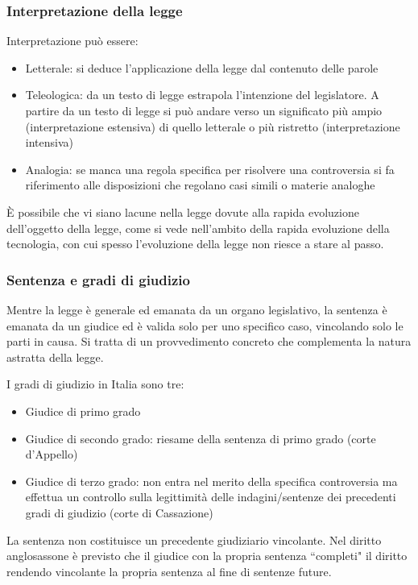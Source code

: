 \subsubsection{Interpretazione della legge}
Interpretazione può essere:
\begin{itemize}
    \item Letterale: si deduce l'applicazione della legge dal contenuto delle parole
    \item Teleologica: da un testo di legge estrapola l'intenzione del legislatore. A partire da un testo di legge si può andare verso un significato più ampio (interpretazione estensiva) di quello letterale o più ristretto (interpretazione intensiva)
    \item Analogia: se manca una regola specifica per risolvere una controversia si fa riferimento alle disposizioni che regolano casi simili o materie analoghe
\end{itemize}

È possibile che vi siano lacune nella legge dovute alla rapida evoluzione dell'oggetto della legge, come si vede nell'ambito della rapida evoluzione della tecnologia, con cui spesso l'evoluzione della legge non riesce a stare al passo.


\subsubsection{Sentenza e gradi di giudizio}
Mentre la legge è generale ed emanata da un organo legislativo, la sentenza è emanata da un giudice ed è valida solo per uno specifico caso, vincolando solo le parti in causa. Si tratta di un provvedimento concreto che complementa la natura astratta della legge.

I gradi di giudizio in Italia sono tre:
\begin{itemize}
    \item Giudice di primo grado
    \item Giudice di secondo grado: riesame della sentenza di primo grado (corte d'Appello)
    \item Giudice di terzo grado: non entra nel merito della specifica controversia ma effettua un controllo sulla legittimità delle indagini/sentenze dei precedenti gradi di giudizio (corte di Cassazione)
\end{itemize}

La sentenza non costituisce un precedente giudiziario vincolante. Nel diritto anglosassone è previsto che il giudice con la propria sentenza ``completi" il diritto rendendo vincolante la propria sentenza al fine di sentenze future.
